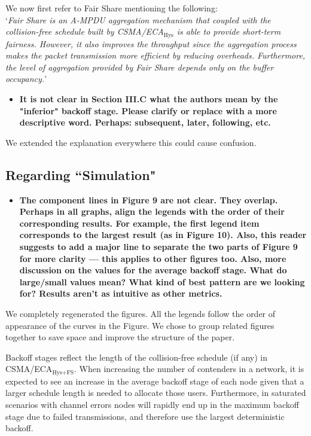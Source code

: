 \documentclass[]{article}
\begin{document}
		We now first refer to Fair Share mentioning the following:\\
		
		`\emph{Fair Share is an A-MPDU aggregation mechanism that coupled with the collision-free schedule built by CSMA/ECA$_{\text{Hys}}$ is able to provide short-term fairness. However, it also improves the throughput since the aggregation process makes the packet transmission more efficient by reducing overheads. Furthermore, the level of aggregation provided by Fair Share depends only on the buffer occupancy.}'
		
		\begin{itemize}
			\item {\bfseries It is not clear in Section III.C what the authors mean by the "inferior" backoff stage. Please clarify or replace with a more descriptive word. Perhaps: subsequent, later, following, etc.}
		\end{itemize}
		
		We extended the explanation everywhere this could cause confusion. 
		
	\subsection{Regarding ``Simulation"}
		\begin{itemize}
			\item {\bfseries The component lines in Figure 9 are not clear. They overlap. Perhaps in all graphs, align the legends with the order of their corresponding results. For example, the first legend item corresponds to the largest result (as in Figure 10). Also, this reader suggests to add a major line to separate the two parts of Figure 9 for more clarity --- this applies to other figures too. Also, more discussion on the values for the average backoff stage. What do large/small values mean? What kind of best pattern are we looking for? Results aren't as intuitive as other metrics.}
		\end{itemize}
		
		We completely regenerated the figures. All the legends follow the order of appearance of the curves in the Figure. We chose to group related figures together to save space and improve the structure of the paper.
		
		Backoff stages reflect the length of the collision-free schedule (if any) in CSMA/ECA$_{\text{Hys+FS}}$. When increasing the number of contenders in a network, it is expected to see an increase in the average backoff stage of each node given that a larger schedule length is needed to allocate those users. Furthermore, in saturated scenarios with channel errors nodes will rapidly end up in the maximum backoff stage due to failed transmissions, and therefore use the largest deterministic backoff.
			
\end{document}
